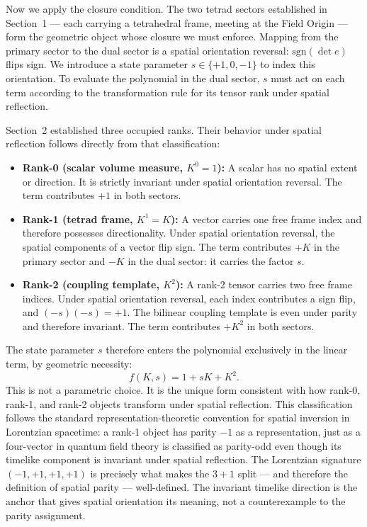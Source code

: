 \documentclass[a4paper,11pt]{article}
\begin{document}
Now we apply the closure condition. The two tetrad sectors
established in Section~1 --- each carrying a tetrahedral
frame, meeting at the Field Origin --- form the geometric
object whose closure we must enforce. Mapping from the
primary sector to the dual sector is a spatial orientation
reversal: $\mathrm{sgn}(\det e)$ flips sign. We introduce
a state parameter $s \in \{+1, 0, -1\}$ to index this
orientation. To evaluate the polynomial in the dual sector,
$s$ must act on each term according to the transformation
rule for its tensor rank under spatial reflection.

Section~2 established three occupied ranks.
Their behavior under spatial reflection follows directly
from that classification:
\begin{itemize}
\item \textbf{Rank-0 (scalar volume measure, $K^0 = 1$):}
A scalar has no spatial extent or direction. It is strictly
invariant under spatial orientation reversal. The term
contributes $+1$ in both sectors.
\item \textbf{Rank-1 (tetrad frame, $K^1 = K$):}
A vector carries one free frame index and therefore
possesses directionality. Under spatial orientation
reversal, the spatial components of a vector flip sign.
The term contributes $+K$ in the primary sector and
$-K$ in the dual sector: it carries the factor $s$.
\item \textbf{Rank-2 (coupling template, $K^2$):}
A rank-2 tensor carries two free frame indices. Under
spatial orientation reversal, each index contributes a
sign flip, and $(-s)(-s) = +1$. The bilinear coupling
template is even under parity and therefore invariant.
The term contributes $+K^2$ in both sectors.
\end{itemize}
The state parameter $s$ therefore enters the polynomial
exclusively in the linear term, by geometric necessity:
\begin{equation}
  f(K, s) = 1 + sK + K^2.
  \label{eq:polynomial_s}
\end{equation}
This is not a parametric choice. It is the unique form
consistent with how rank-0, rank-1, and rank-2 objects
transform under spatial reflection. This classification
follows the standard representation-theoretic convention
for spatial inversion in Lorentzian spacetime: a rank-1
object has parity $-1$ as a representation, just as a
four-vector in quantum field theory is classified as
parity-odd even though its timelike component is invariant
under spatial reflection. The Lorentzian signature
$(-1,+1,+1,+1)$ is precisely what makes the $3+1$ split
--- and therefore the definition of spatial parity ---
well-defined. The invariant timelike direction is the
anchor that gives spatial orientation its meaning, not a
counterexample to the parity assignment.
\end{document}
